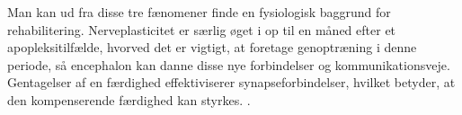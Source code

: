 Man kan ud fra disse tre fænomener finde en fysiologisk baggrund for rehabilitering. Nerveplasticitet er særlig øget i op til en måned efter et apopleksitilfælde, hvorved det er vigtigt, at foretage genoptræning i denne periode, så encephalon kan danne disse nye forbindelser og kommunikationsveje. \cite{Rugnett2015} Gentagelser af en færdighed effektiviserer synapseforbindelser, hvilket betyder, at den kompenserende færdighed kan styrkes. \cite{Stanfield2014}.